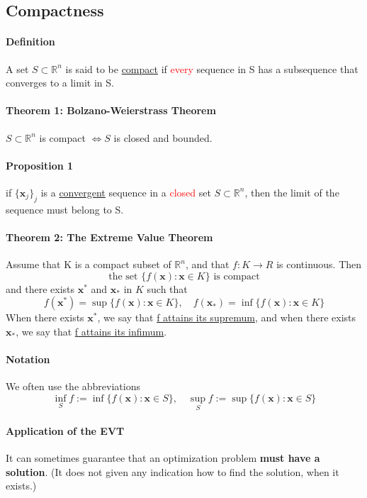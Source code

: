 \documentclass[11pt]{article}
\newcommand{\tb}[1]{\textbf{#1}}
\newcommand{\real}[0]{\mathbb{R}}
\newcommand{\under}[1]{\underline{#1}}
\newcommand{\vx}[0]{\tb{x}}
\begin{document}
\subsection{Compactness}
\paragraph{Definition} A set $S \subset \real^n$ is said to be \under{compact} if \textcolor{red}{every} sequence in S has a subsequence that converges to a limit in S.
\paragraph{Theorem 1: Bolzano-Weierstrass Theorem} $S \subset \real^n$ is compact $\iff S$ is closed and bounded.
\paragraph{Proposition 1} if $\{\vx_j\}_j$ is a \under{convergent} sequence in a \textcolor{red}{closed} set $S \subset \real^n$, then the limit of the sequence must belong to S.

\paragraph{Theorem 2: The Extreme Value Theorem} Assume that K is a compact subset of $\real^n$, and that $f: K \rightarrow R$ is continuous. Then
\begin{equation*}
	\mbox{the set }\{f(\vx): \vx \in K\} \mbox{ is compact}
\end{equation*}
and there exists $\vx^*$ and $\vx_*$ in $K$ such that
$$f(\vx^*) = \sup\{f(\vx): \vx \in K\}, \quad f(\vx_*) = \inf\{f(\vx): \vx \in K\}$$
When there exists $\vx^*$, we say that \under{f attains its supremum}, and when there exists $\vx_*$, we say that \under{f attains its infimum}.
\paragraph{Notation} We often use the abbreviations
$$\underset{S}{\inf} f := \inf\{f(\vx): \vx \in S\}, \quad \underset{S}{\sup} f:= \sup\{f(\vx): \vx \in S\}$$

\paragraph{Application of the EVT}
It can sometimes guarantee that an optimization problem \tb{must have a solution}.
(It does not given any indication how to find the solution, when it exists.)
\end{document}
